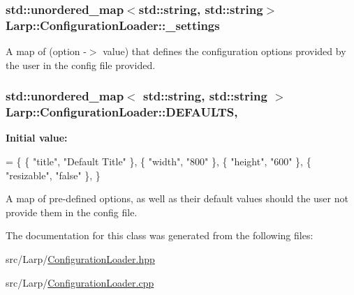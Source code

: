 \subsubsection[{\texorpdfstring{\+\_\+settings}{_settings}}]{\setlength{\rightskip}{0pt plus 5cm}std\+::unordered\+\_\+map$<$std\+::string, std\+::string$>$ Larp\+::\+Configuration\+Loader\+::\+\_\+settings\hspace{0.3cm}{\ttfamily [private]}}\hypertarget{classLarp_1_1ConfigurationLoader_ab952b0b19ffa465a73fd58302fccb124}{}\label{classLarp_1_1ConfigurationLoader_ab952b0b19ffa465a73fd58302fccb124}
A map of (option -\/$>$ value) that defines the configuration options provided by the user in the config file provided. 
\subsubsection[{\texorpdfstring{D\+E\+F\+A\+U\+L\+TS}{DEFAULTS}}]{\setlength{\rightskip}{0pt plus 5cm}std\+::unordered\+\_\+map$<$ std\+::string, std\+::string $>$ Larp\+::\+Configuration\+Loader\+::\+D\+E\+F\+A\+U\+L\+TS\hspace{0.3cm}{\ttfamily [static]}, {\ttfamily [private]}}\hypertarget{classLarp_1_1ConfigurationLoader_a5b5d1d47f1f5cced025a85d248ae57e7}{}\label{classLarp_1_1ConfigurationLoader_a5b5d1d47f1f5cced025a85d248ae57e7}
{\bfseries Initial value\+:}
\begin{DoxyCode}
= \{
    \{ \textcolor{stringliteral}{"title"},     \textcolor{stringliteral}{"Default Title"} \},
    \{ \textcolor{stringliteral}{"width"},     \textcolor{stringliteral}{"800"} \},
    \{ \textcolor{stringliteral}{"height"},    \textcolor{stringliteral}{"600"} \},
    \{ \textcolor{stringliteral}{"resizable"}, \textcolor{stringliteral}{"false"} \},
\}
\end{DoxyCode}
A map of pre-\/defined options, as well as their default values should the user not provide them in the config file. 

The documentation for this class was generated from the following files\+:\begin{DoxyCompactItemize}
\item 
src/\+Larp/\hyperlink{ConfigurationLoader_8hpp}{Configuration\+Loader.\+hpp}\item 
src/\+Larp/\hyperlink{ConfigurationLoader_8cpp}{Configuration\+Loader.\+cpp}\end{DoxyCompactItemize}
